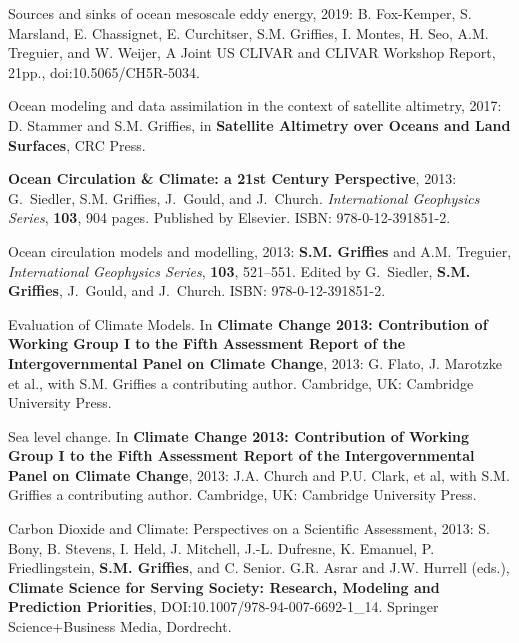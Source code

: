 \begin{etaremune}

\item Sources and sinks of ocean mesoscale eddy energy, 2019: B. Fox-Kemper,  S. Marsland, E. Chassignet, E. Curchitser, S.M. Griffies, I. Montes, H. Seo, A.M. Treguier, and W. Weijer, A Joint US CLIVAR and CLIVAR Workshop Report, 21pp., doi:10.5065/CH5R-5034.

\item Ocean modeling and data assimilation in the context of satellite altimetry, 2017: D. Stammer and S.M. Grif\/f\/ies, in  {\bf Satellite Altimetry over Oceans and Land Surfaces}, CRC Press.
  
\item {\bf Ocean Circulation \& Climate: a 21st Century Perspective},
  2013: G.\ Siedler, S.M. Grif\/f\/ies, J.\ Gould, and J.\ Church.
  {\it International Geophysics Series}, {\bf 103}, 904
  pages. Published by Elsevier.  ISBN: 978-0-12-391851-2.

\item Ocean circulation models and modelling, 2013: {\bf
    S.M. Grif\/f\/ies} and A.M. Treguier, {\it International Geophysics
    Series}, {\bf 103}, 521--551.  Edited by G.\ Siedler, {\bf
    S.M. Grif\/f\/ies}, J.\ Gould, and J.\ Church.  ISBN:
  978-0-12-391851-2.

\item Evaluation of Climate Models.  In {\bf Climate Change 2013:
    Contribution of Working Group I to the Fifth Assessment Report of
    the Intergovernmental Panel on Climate Change}, 2013: G. Flato,
  J. Marotzke et al., with S.M. Grif\/f\/ies a contributing
  author.   Cambridge, UK: Cambridge University Press.

\item Sea level change.  In {\bf Climate Change 2013: Contribution of
    Working Group I to the Fifth Assessment Report of the
    Intergovernmental Panel on Climate Change}, 2013: J.A. Church and
  P.U. Clark, et al, with S.M. Grif\/f\/ies a contributing
  author.  Cambridge, UK: Cambridge University Press.

\item Carbon Dioxide and Climate: Perspectives on a Scientific
  Assessment, 2013: S. Bony, B. Stevens, I. Held, J. Mitchell,
  J.-L. Dufresne, K. Emanuel, P. Friedlingstein, {\bf
    S.M. Grif\/f\/ies}, and C. Senior. G.R. Asrar and J.W. Hurrell
  (eds.), {\bf Climate Science for Serving Society: Research, Modeling
    and Prediction Priorities}, DOI:10.1007/978-94-007-6692-1\_14.
  Springer Science+Business Media, Dordrecht.


\end{etaremune}
